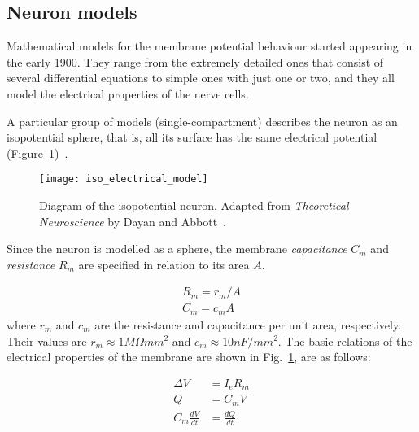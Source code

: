\subsection{Neuron models}

Mathematical models for the membrane potential behaviour started appearing in the early 1900. They range from the extremely detailed ones that consist of several differential equations to simple ones with just one or two, and they all model the electrical properties of the nerve cells. 

A particular group of models (single-compartment) describes the neuron as an isopotential sphere, that is, all its surface has the same electrical potential (Figure~\ref{fig:neuro:isopotential})~\cite{dayan2001theoretical}.

\begin{figure}[hbt]
  \begin{center}
    \texttt{[image: iso\_electrical\_model]}
    \caption{Diagram of the isopotential neuron. Adapted from \emph{Theoretical Neuroscience} by Dayan and Abbott~\cite{dayan2001theoretical}.}
    \label{fig:neuro:isopotential}
  \end{center}
\end{figure}

Since the neuron is modelled as a sphere, the membrane \emph{capacitance} $C_{m}$ and \emph{resistance} $R_{m}$ are specified in relation to its area $A$.

\begin{align}
R_{m} = r_{m}/A \\
C_{m} = c_{m}A
\end{align}
where $r_{m}$ and $c_{m}$ are the resistance and capacitance per unit area, 
respectively. Their values are $r_{m} \approx 1M \Omega mm^{2}$ and $c_{m} 
\approx 10nF/mm^{2}$. The basic relations of the electrical properties of the membrane are shown in  
Fig.~\ref{fig:neuro:isopotential}, are as follows:

\begin{align}
\Delta V &= I_{e}R_{m} \label{eq:neuro:volt-shift}\\[0.5em]
Q &= C_{m}V \label{eq:neuro:charge} \\[0.5em]
C_{m}\frac{dV}{dt} &= \frac{dQ}{dt} \label{eq:neuro:cap-curr}
\end{align}


